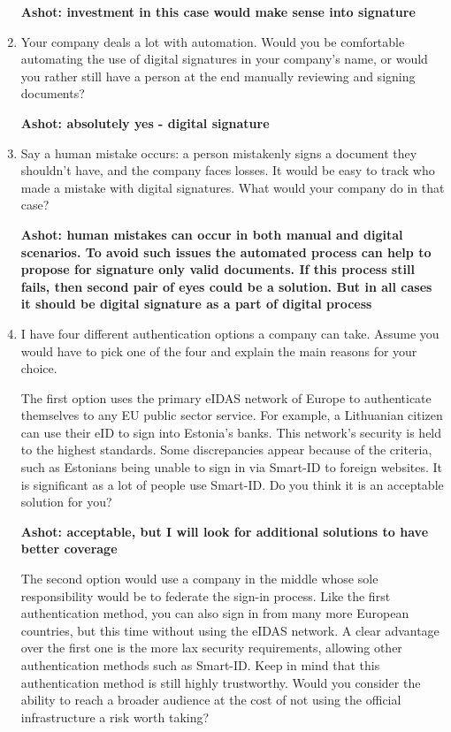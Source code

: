 \begin{enumerate}
    \textbf{Ashot: investment in this case would make sense into signature}
    \item Your company deals a lot with automation. Would you be comfortable automating the use of digital signatures in your company's name, or would you rather still have a person at the end manually reviewing and signing documents?
    
    \textbf{Ashot: absolutely yes - digital signature}
    \item Say a human mistake occurs: a person mistakenly signs a document they shouldn't have, and the company faces losses. It would be easy to track who made a mistake with digital signatures. What would your company do in that case?
    
    \textbf{Ashot: human mistakes can occur in both manual and digital scenarios. To avoid such issues the automated process can help to propose for signature only valid documents. If this process still fails, then second pair of eyes could be a solution. But in all cases it should be digital signature as a part of digital process}
    \item I have four different authentication options a company can take. Assume you would have to pick one of the four and explain the main reasons for your choice.
    
    The first option uses the primary eIDAS network of Europe to authenticate themselves to any EU public sector service. For example, a Lithuanian citizen can use their eID to sign into Estonia's banks. This network's security is held to the highest standards. Some discrepancies appear because of the criteria, such as Estonians being unable to sign in via Smart-ID to foreign websites. It is significant as a lot of people use Smart-ID. Do you think it is an acceptable solution for you?

    \textbf{Ashot: acceptable, but I will look for additional solutions to have better coverage}

    The second option would use a company in the middle whose sole responsibility would be to federate the sign-in process. Like the first authentication method, you can also sign in from many more European countries, but this time without using the eIDAS network. A clear advantage over the first one is the more lax security requirements, allowing other authentication methods such as Smart-ID. Keep in mind that this authentication method is still highly trustworthy. Would you consider the ability to reach a broader audience at the cost of not using the official infrastructure a risk worth taking?


\end{enumerate}
